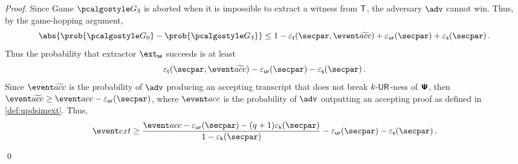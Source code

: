 \begin{proof}
	 Since Game $\game{3}$ is aborted when it is impossible to
	extract a witness from $\mathsf{T}$,
	the adversary $\advse$ cannot win. Thus, by the game-hopping argument,
	\[
	\abs{\prob{\game{0}} - \prob{\game{3}}} \leq 1 - \epst(\secpar, \waccProb)
		 + \epsur(\secpar) +
	\epss(\secpar)\,.
	\]
	Thus the probability that extractor $\extse$ succeeds is at least
	\[
	\epst(\secpar, \waccProb) - 
	\epsur(\secpar)
	- \epss(\secpar)\,.
	\]
	Since $\waccProb$ is the probability of $\advse$ producing an accepting transcript
	that does not break ${k\text{-}\mathsf{UR}}$-ness of $\bm{\mathsf{\Psi}}$, then $\waccProb \geq \accProb -
	\epsur(\secpar)$, where $\accProb$ is the probability of $\advse$ outputting an accepting
	proof as defined in \cref{def:updsimext}. Thus, 
	\begin{equation}
	\label{eq:frk}
	\extProb \geq \frac{\accProb - \epsur(\secpar) - (q + 1) \epsk(\secpar)}{1 - \epsk(\secpar)} 
	- \epsur(\secpar) - \epss(\secpar)\,.
	\end{equation}

	\qed
\end{proof}


